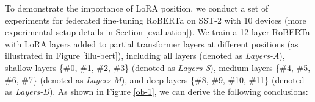 

To demonstrate the importance of LoRA position, we conduct a set of experiments for federated fine-tuning RoBERTa \cite{liu2019roberta} on SST-2 \cite{wang2018glue} with 10 devices (more experimental setup details in Section \ref{evaluation}).
We train a 12-layer RoBERTa with LoRA layers added to partial transformer layers at different positions (as illustrated in Figure \ref{illu-bert}), including all layers (denoted as \textit{Layers-A}), shallow layers \{\#0, \#1, \#2, \#3\} (denoted as \textit{Layers-S}), medium layers \{\#4, \#5, \#6, \#7\} (denoted as \textit{Layers-M}), and deep layers \{\#8, \#9, \#10, \#11\} (denoted as \textit{Layers-D}).
As shown in Figure \ref{ob-1}, we can derive the following conclusions:

